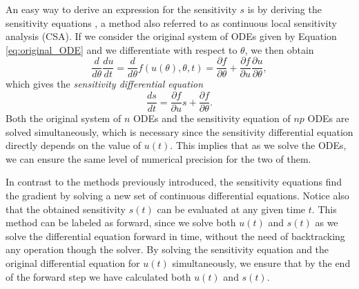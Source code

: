 An easy way to derive an expression for the sensitivity $s$ is by deriving the sensitivity equations \cite{ramsay2017dynamic}, a method also referred to as continuous local sensitivity analysis (CSA). 
If we consider the original system of ODEs given by Equation \eqref{eq:original_ODE} and we differentiate with respect to $\theta$, we then obtain
\begin{equation}
 \frac{d}{d\theta} \frac{du}{dt} 
 =
 \frac{d}{d\theta} f(u(\theta), \theta, t)
 = 
 \frac{\partial f}{\partial \theta}
 + 
 \frac{\partial f}{\partial u} \frac{\partial u}{\partial \theta},
\end{equation}
which gives the \textit{sensitivity differential equation} 
\begin{equation}
 \frac{ds}{dt} = \frac{\partial f}{\partial u} s + \frac{\partial f}{\partial \theta}.
 \label{eq:sensitivity_equations}
\end{equation}
Both the original system of $n$ ODEs and the sensitivity equation of $np$ ODEs are solved simultaneously, which is necessary since the sensitivity differential equation directly depends on the value of $u(t)$.  
This implies that as we solve the ODEs, we can ensure the same level of numerical precision for the two of them.

In contrast to the methods previously introduced, the sensitivity equations find the gradient by solving a new set of continuous differential equations.
Notice also that the obtained sensitivity $s(t)$ can be evaluated at any given time $t$. 
This method can be labeled as forward, since we solve both $u(t)$ and $s(t)$ as we solve the differential equation forward in time, without the need of backtracking any operation though the solver.
By solving the sensitivity equation and the original differential equation for $u(t)$ simultaneously, we ensure that by the end of the forward step we have calculated both $u(t)$ and $s(t)$. 


